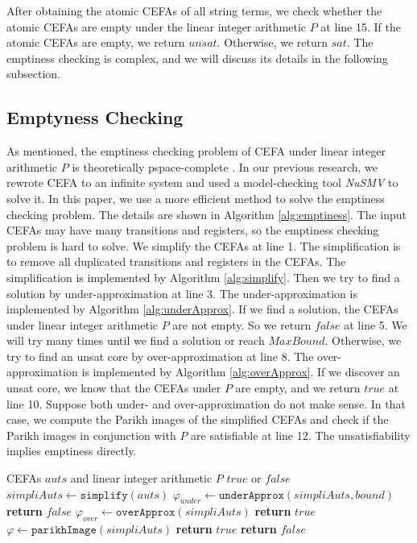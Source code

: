 \documentclass[sigconf]{acmart}
\newcommand*{\algfun}[1]{\texttt{#1}}
\begin{document}
After obtaining the atomic CEFAs of all string terms, we check whether the atomic CEFAs are empty under the linear integer arithmetic $P$ at line 15. If the atomic CEFAs are empty, we return $unsat$. Otherwise, we return $sat$. The emptiness checking is complex, and we will discuss its details in the following subsection.\newline


\subsection{Emptyness Checking}
As mentioned, the emptiness checking problem of CEFA under linear integer arithmetic $P$ is theoretically pspace-complete \cite{atva2020}. In our previous research, we rewrote CEFA to an infinite system and used a model-checking tool \emph{NuSMV} to solve it. In this paper, we use a more efficient method to solve the emptiness checking problem. The details are shown in Algorithm \ref{alg:emptiness}.\newline
The input CEFAs may have many transitions and registers, so the emptiness checking problem is hard to solve. We simplify the CEFAs at line 1. The simplification is to remove all duplicated transitions and registers in the CEFAs. The simplification is implemented by Algorithm \ref{alg:simplify}. Then we try to find a solution by under-approximation at line 3. The under-approximation is implemented by Algorithm \ref{alg:underApprox}. If we find a solution, the CEFAs under linear integer arithmetic $P$ are not empty. So we return $false$ at line 5. We will try many times until we find a solution or reach $MaxBound$. Otherwise, we try to find an unsat core by over-approximation at line 8. The over-approximation is implemented by Algorithm \ref{alg:overApprox}. If we discover an unsat core, we know that the CEFAs under $P$ are empty, and we return $true$ at line 10. Suppose both under- and over-approximation do not make sense. In that case, we compute the Parikh images\cite{parikh_2005} of the simplified CEFAs and check if the Parikh images in conjunction with $P$ are satisfiable at line 12. The unsatisfiability implies emptiness directly.
\begin{algorithm}
  \caption{ $\algfun{isEmpty}(auts, P)$}
  \label{alg:emptiness}
  \begin{algorithmic}[1]
    \Require CEFAs $auts$ and linear integer arithmetic $P$
    \Ensure $true$ or $false$
    \Statex
    \State $simpliAuts \leftarrow \algfun{simplify}(auts)$
      \State $\varphi_{under}\gets \algfun{underApprox}(simpliAuts, bound)$
        \State \textbf{return} $false$
      \EndIf
    \EndFor
    \State $\varphi_{over}\gets \algfun{overApprox}(simpliAuts)$
      \State \textbf{return} $true$
    \EndIf
    \State $\varphi \gets \algfun{parikhImage}(simpliAuts)$
      \State \textbf{return} $true$
    \Else
      \State \textbf{return} $false$
    \EndIf
  \end{algorithmic}
\end{algorithm}
\end{document}
